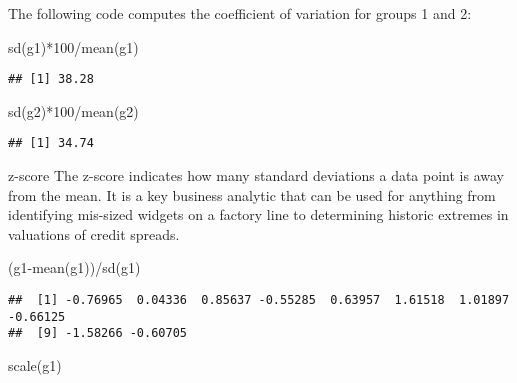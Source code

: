 \documentclass[
  ignorenonframetext,
]{beamer}
\newenvironment{Shaded}{\begin{snugshade}}{\end{snugshade}}
\newcommand{\DecValTok}[1]{\textcolor[rgb]{0.00,0.00,0.81}{#1}}
\newcommand{\FunctionTok}[1]{\textcolor[rgb]{0.00,0.00,0.00}{#1}}
\newcommand{\NormalTok}[1]{#1}
\newcommand{\SpecialCharTok}[1]{\textcolor[rgb]{0.00,0.00,0.00}{#1}}
\begin{document}
\begin{frame}[fragile]
The following code computes the coefficient of variation for groups 1
and 2:

\begin{Shaded}
\begin{Highlighting}[]
\FunctionTok{sd}\NormalTok{(g1)}\SpecialCharTok{*}\DecValTok{100}\SpecialCharTok{/}\FunctionTok{mean}\NormalTok{(g1) }
\end{Highlighting}
\end{Shaded}

\begin{verbatim}
## [1] 38.28
\end{verbatim}

\begin{Shaded}
\begin{Highlighting}[]
\FunctionTok{sd}\NormalTok{(g2)}\SpecialCharTok{*}\DecValTok{100}\SpecialCharTok{/}\FunctionTok{mean}\NormalTok{(g2) }
\end{Highlighting}
\end{Shaded}

\begin{verbatim}
## [1] 34.74
\end{verbatim}
\end{frame}

\begin{frame}[fragile]{z-score}
\protect\hypertarget{z-score}{}
The z-score indicates how many standard deviations a data point is away
from the mean. It is a key business analytic that can be used for
anything from identifying mis-sized widgets on a factory line to
determining historic extremes in valuations of credit spreads.

\begin{Shaded}
\begin{Highlighting}[]
\NormalTok{(g1}\SpecialCharTok{{-}}\FunctionTok{mean}\NormalTok{(g1))}\SpecialCharTok{/}\FunctionTok{sd}\NormalTok{(g1) }
\end{Highlighting}
\end{Shaded}

\begin{verbatim}
##  [1] -0.76965  0.04336  0.85637 -0.55285  0.63957  1.61518  1.01897 -0.66125
##  [9] -1.58266 -0.60705
\end{verbatim}

\begin{Shaded}
\begin{Highlighting}[]
\FunctionTok{scale}\NormalTok{(g1)}
\end{Highlighting}
\end{Shaded}
\end{frame}
\end{document}
